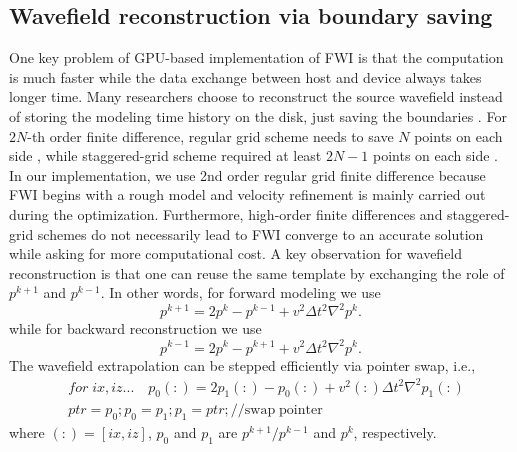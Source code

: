 

\subsection{Wavefield reconstruction via boundary saving}

One key problem of GPU-based implementation of FWI is that the computation is much faster while the data exchange between host and device always takes longer time. Many researchers choose to reconstruct the source wavefield instead of storing the modeling time history on the disk, just saving the boundaries \citep{dussaud2008computational,Yang201464}. For $2N$-th order finite difference, regular grid scheme needs to save $N$ points on each side \citep{dussaud2008computational}, while staggered-grid scheme required at least $2N-1$ points on each side \citep{Yang201464}. In our implementation, we use 2nd order regular grid finite difference because FWI begins with a rough model and velocity refinement is mainly carried out during the optimization. Furthermore, high-order finite differences and staggered-grid schemes do not necessarily lead to FWI converge to an accurate solution while asking for more computational cost. A key observation for wavefield reconstruction is that one can reuse the same template by exchanging the role of $p^{k+1}$ and $p^{k-1}$. In other words, for forward modeling we use
\begin{equation}\label{eq:forward}
p^{k+1}=2p^{k}-p^{k-1}+v^2\Delta t^2 \nabla^2 p^{k}.
\end{equation}
while for backward reconstruction we use
\begin{equation}\label{eq:backward}
p^{k-1}=2p^{k}-p^{k+1}+v^2\Delta t^2 \nabla^2 p^{k}.
\end{equation}
The wavefield extrapolation can be stepped efficiently via pointer swap, i.e.,
\begin{equation}
\begin{split}
 &for\;ix,iz... \quad p_0(:)=2p_1(:)-p_0(:)+v^2(:)\Delta t^2 \nabla^2 p_1(:)\\
 &ptr=p_0;p_0=p_1;p_1=ptr;// \mathrm{swap\; pointer}
\end{split}
\end{equation}
where $(:)=[ix,iz]$, $p_0$ and $p_1$ are $p^{k+1}/p^{k-1}$ and $p^k$, respectively. 



